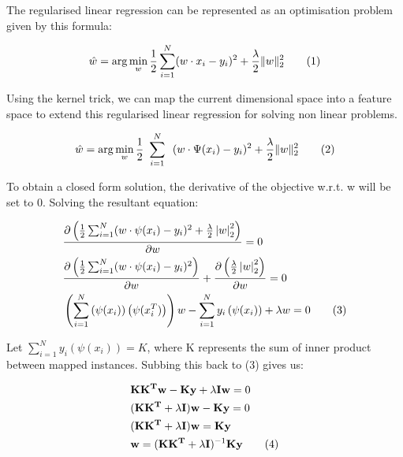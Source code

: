 \documentclass{article}
\newcommand\numberthis{\addtocounter{equation}{1}\tag{\theequation}}
\begin{document}
The regularised linear regression can be represented as an optimisation problem given by this formula:

\begin{align*}
    \hat{w}=\arg\operatorname*{min}_{w}\frac{1}{2}\sum_{i=1}^{N}(w\cdot x_{i}-y_{i})^{2}+\frac{\lambda}{2}\|w\|_{2}^{2} \numberthis \label{eqn}
\end{align*} 

Using the kernel trick, we can map the current dimensional space into a feature space to extend this regularised linear regression for solving non linear problems.

\begin{align*}
    \hat{w}=\arg\operatorname*{min}_{w}\frac{1}{2}~\sum_{i=1}^{N}~~(w \cdot \Psi(x_{i})-y_{i})^2 + \frac{\lambda}{2}\|w\|_{2}^{2} \numberthis \label{eqn}
\end{align*}

To obtain a closed form solution, the derivative of the objective w.r.t. w will be set to 0. Solving the resultant equation:

\begin{align*}
    & \frac{\partial\left(\frac{1}{2}\sum_{i=1}^{N}(w\cdot \psi(x_{i})-y_{i})^{2}+\frac{\lambda}{2}\left|w\right|_{2}^{2}\right)}{\partial w}=0 \\
    & \frac{\partial\left(\frac{1}{2}\sum_{i=1}^{N}(w\cdot \psi(x_{i})-y_{i})^{2}\right)}{\partial w}+ {\frac{\partial \left(\frac{\lambda}{2}\left|w\right|_{2}^{2}\right)}{\partial w}} = 0 \\
    & \left(\sum_{i=1}^{N}\left(\psi(x_{i})\right) \left(\psi(x_{i}^{T})\right)\right)w-\sum_{i=1}^{N}y_{i}\left(\psi (x_{i}) \right) + \lambda w=0 \numberthis \label{eqn}
\end{align*}

Let $\sum_{i=1}^{N}y_{i}\left(\psi (x_{i}) \right) = K$, where K represents the sum of inner product between mapped instances. Subbing this back to (3) gives us:

\begin{align*}
    &\mathbf{KK^Tw}-\mathbf{Ky}+ \mathbf{\lambda Iw}=0 \\
    & (\mathbf{KK^T}+\mathbf{\lambda I})\mathbf{w} - \mathbf{Ky}=0 \\
    & (\mathbf{KK^T}+\mathbf{\lambda I})\mathbf{w} = \mathbf{Ky} \\
    & \mathbf{w}=(\mathbf{KK^T}+\mathbf{\lambda I})^{-1}\mathbf{Ky} \numberthis \label{eqn}
\end{align*}
\end{document}
